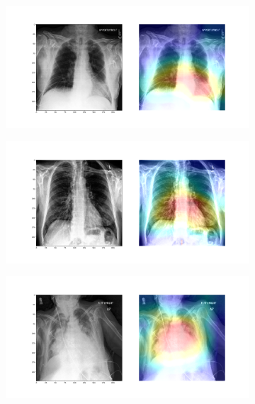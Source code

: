 \documentclass{amia}
\begin{document}
\begin{figure}[ht]
\begin{subfigure}{0.5\linewidth}
	\centering
	\includegraphics[width=\linewidth]{patient64541_1.png}
	\label{fig:a}
\end{subfigure}
\begin{subfigure}{0.5\linewidth}
	\centering
	\includegraphics[width=\linewidth]{patient64547_1.png}
	\label{fig:b}
\end{subfigure}
\par\bigskip
\begin{subfigure}{0.5\linewidth}
	\centering
	\includegraphics[width=\linewidth]{patient64552_1.png}

\end{subfigure}
\end{figure}
\end{document}
